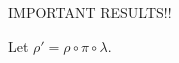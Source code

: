 \documentclass[11pt]{amsart}
\newtheorem{definition}{{\bf Definition}}
\newtheorem{lemma}[theorem]{{\bf Lemma }}
\begin{document}
\begin{comment}
\begin{definition}
We define the LSFR in the usual way (put actual definitnion) and always use a primitive root.
\end{definition}
\begin{lemma}
If we choose $\beta$ as an initial value in the LSFR it will generate the outputs $\beta, \alpha \beta, \alpha^2 \beta, \dots, \alpha^{p^{r}-1}$ where $\alpha$ is the primitive root associated with the LSFR.
\end{lemma}

\begin{lemma}
UPDATE WITH NEWER NOTATION Let $\phi(k,h)$ be our key schedule defined by an LSFR on some subspace of the message space. For all rounds $h$, $\phi(0,h) = 0$.
\end{lemma}

This lemma is true in all cases so we must check surjectivity onto generators.

\begin{definition}
Let the encoding function $E$ be any bijection between $[GF(p^{ra)]^{\fram{mn}{a}}$ and $M_{m,n}(GF(p^r))$. Note that this is possible as the spaces are isomorphic.
\end{definition}

\begin{lemma}
Let $LSFR: GF(p^r) \to GF(p^r)$ have associated primitive root $\alpha$. Then, for all $\beta, \gamma \in GF(p^r)^*$, there exists some $k$ such that $\alpha^k \beta = \gamma$.
\end{lemma}
\begin{proof}
This is true as $\alpha$ generates $GF(p^r)^*$.
\end{proof}

\begin{lemma}

\end{lemma}

\begin{lemma}
Im$\phi(k,h)$ is the same for all rounds $h$.
\end{lemma}
\end{comment}



IMPORTANT RESULTS!!


Let $\rho' = \rho \circ \pi \circ \lambda$.
\end{document}
